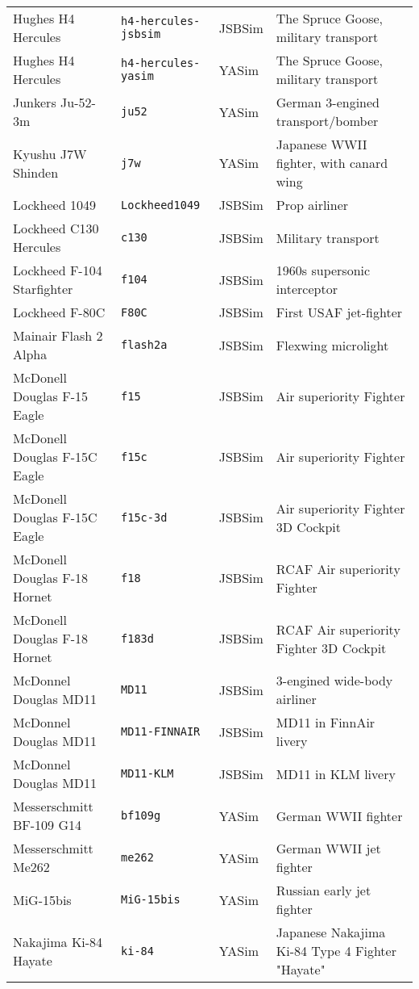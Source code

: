 \begin{tabular}{l|l|l|l}
   Hughes H4 Hercules & \texttt{h4-hercules-jsbsim} & JSBSim & The Spruce Goose, military transport\\
   Hughes H4 Hercules & \texttt{h4-hercules-yasim} & YASim & The Spruce Goose, military transport\\
   Junkers Ju-52-3m & \texttt{ju52} & YASim & German 3-engined transport/bomber\\
   Kyushu J7W Shinden & \texttt{j7w} & YASim & Japanese WWII fighter, with canard wing\\
   Lockheed 1049    & \texttt{Lockheed1049} & JSBSim  &  Prop airliner\\
   Lockheed C130 Hercules & \texttt{c130} & JSBSim & Military transport \\
   Lockheed F-104 Starfighter & \texttt{f104} & JSBSim & 1960s supersonic interceptor\\
   Lockheed F-80C   & \texttt{F80C}       & JSBSim  &  First USAF jet-fighter\\
   Mainair Flash 2 Alpha   & \texttt{flash2a} & JSBSim  &  Flexwing microlight\\
   McDonell Douglas F-15 Eagle & \texttt{f15} & JSBSim & Air superiority Fighter\\
   McDonell Douglas F-15C Eagle & \texttt{f15c} & JSBSim & Air superiority Fighter\\
   McDonell Douglas F-15C Eagle & \texttt{f15c-3d} & JSBSim & Air superiority Fighter 3D Cockpit\\
   McDonell Douglas F-18 Hornet & \texttt{f18} & JSBSim & RCAF Air superiority Fighter\\
   McDonell Douglas F-18 Hornet & \texttt{f183d} & JSBSim & RCAF Air superiority Fighter 3D Cockpit\\
   McDonnel Douglas MD11 & \texttt{MD11}  & JSBSim  &  3-engined wide-body airliner\\
   McDonnel Douglas MD11 & \texttt{MD11-FINNAIR}  & JSBSim  & MD11 in FinnAir livery \\
   McDonnel Douglas MD11 & \texttt{MD11-KLM}  & JSBSim  &  MD11 in KLM livery \\
   Messerschmitt BF-109 G14 & \texttt{bf109g} & YASim & German WWII fighter\\
   Messerschmitt Me262 & \texttt{me262} & YASim & German WWII jet fighter\\
   MiG-15bis        & \texttt{MiG-15bis}  & YASim  &  Russian early jet fighter\\
   Nakajima Ki-84 Hayate & \texttt{ki-84} & YASim & Japanese Nakajima Ki-84 Type 4 Fighter "Hayate"\\

\end{tabular}
